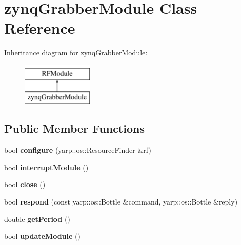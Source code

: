 \hypertarget{classzynqGrabberModule}{}\section{zynq\+Grabber\+Module Class Reference}
\label{classzynqGrabberModule}
Inheritance diagram for zynq\+Grabber\+Module\+:\begin{figure}[H]
\begin{center}
\leavevmode
\includegraphics[height=2.000000cm]{classzynqGrabberModule}
\end{center}
\end{figure}
\subsection*{Public Member Functions}
\begin{DoxyCompactItemize}
\item 
bool {\bfseries configure} (yarp\+::os\+::\+Resource\+Finder \&rf)\hypertarget{classzynqGrabberModule_a2733856709df020d264750ce5afbe552}{}\label{classzynqGrabberModule_a2733856709df020d264750ce5afbe552}

\item 
bool {\bfseries interrupt\+Module} ()\hypertarget{classzynqGrabberModule_aa33152e027843920826ea02f323df8dd}{}\label{classzynqGrabberModule_aa33152e027843920826ea02f323df8dd}

\item 
bool {\bfseries close} ()\hypertarget{classzynqGrabberModule_ae687b7063d3974a71a27a4cae8104480}{}\label{classzynqGrabberModule_ae687b7063d3974a71a27a4cae8104480}

\item 
bool {\bfseries respond} (const yarp\+::os\+::\+Bottle \&command, yarp\+::os\+::\+Bottle \&reply)\hypertarget{classzynqGrabberModule_afb439f66ef1786b6b503597dd6e74f33}{}\label{classzynqGrabberModule_afb439f66ef1786b6b503597dd6e74f33}

\item 
double {\bfseries get\+Period} ()\hypertarget{classzynqGrabberModule_a584429a662fd6eb0b11d77294c1b40a5}{}\label{classzynqGrabberModule_a584429a662fd6eb0b11d77294c1b40a5}

\item 
bool {\bfseries update\+Module} ()\hypertarget{classzynqGrabberModule_a53679eefbe74aa164fde84f9381450bc}{}\label{classzynqGrabberModule_a53679eefbe74aa164fde84f9381450bc}

\end{DoxyCompactItemize}


